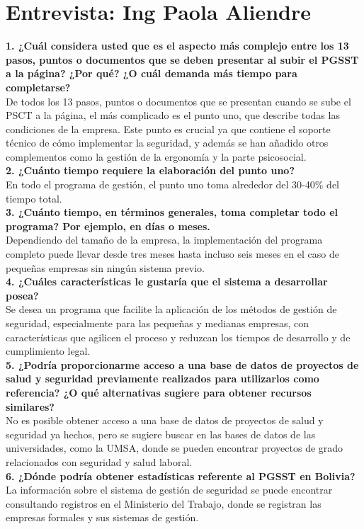 \chapter{Entrevista: Ing Paola Aliendre}
\label{sec:entrevista01}

\noindent
\textbf{1. ¿Cuál considera usted que es el aspecto más complejo entre los 13 pasos, puntos o documentos que se deben presentar al subir el PGSST a la página? ¿Por qué? ¿O cuál demanda más tiempo para completarse?}\\
De todos los 13 pasos, puntos o documentos que se presentan cuando se sube el PSCT a la página, el más complicado es el punto uno, que describe todas las condiciones de la empresa. Este punto es crucial ya que contiene el soporte técnico de cómo implementar la seguridad, y además se han añadido otros complementos como la gestión de la ergonomía y la parte psicosocial.
\\
\noindent
\textbf{2. ¿Cuánto tiempo requiere la elaboración del punto uno?}\\
En todo el programa de gestión, el punto uno toma alrededor del 30-40\% del tiempo total.
\\
\noindent
\textbf{3. ¿Cuánto tiempo, en términos generales, toma completar todo el programa? Por ejemplo, en días o meses.}\\
Dependiendo del tamaño de la empresa, la implementación del programa completo puede llevar desde tres meses hasta incluso seis meses en el caso de pequeñas empresas sin ningún sistema previo.
\\
\noindent
\textbf{4. ¿Cuáles características le gustaría que el sistema a desarrollar posea?}\\
Se desea un programa que facilite la aplicación de los métodos de gestión de seguridad, especialmente para las pequeñas y medianas empresas, con características que agilicen el proceso y reduzcan los tiempos de desarrollo y de cumplimiento legal.
\\
\noindent
\textbf{5. ¿Podría proporcionarme acceso a una base de datos de proyectos de salud y seguridad previamente realizados para utilizarlos como referencia? ¿O qué alternativas sugiere para obtener recursos similares?}\\
No es posible obtener acceso a una base de datos de proyectos de salud y seguridad ya hechos, pero se sugiere buscar en las bases de datos de las universidades, como la UMSA, donde se pueden encontrar proyectos de grado relacionados con seguridad y salud laboral.
\\
\noindent
\textbf{6. ¿Dónde podría obtener estadísticas referente al PGSST en Bolivia?}\\
La información sobre el sistema de gestión de seguridad se puede encontrar consultando registros en el Ministerio del Trabajo, donde se registran las empresas formales y sus sistemas de gestión.
